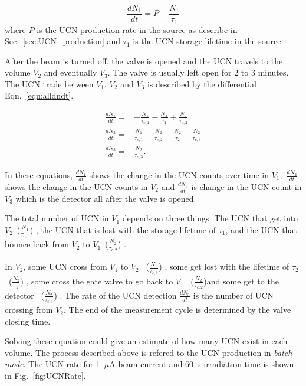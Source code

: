 \begin{equation}
  \label{eqn:dndt}
\frac{dN_1}{dt} = P - \frac{N_1}{\tau_1}  
\end{equation}
where $P$ is the UCN production rate in the source as describe in
Sec.~\ref{sec:UCN_production} and $\tau_1$ is the UCN storage lifetime
in the source.

After the beam is turned off, the valve is opened and the UCN travels
to the volume $V_2$ and eventually $V_3$. The valve is usually left
open for 2 to 3 minutes. The UCN trade between $V_1$, $V_2$ and $V_3$
is described by the differential Eqn.~\ref{eqn:alldndt}.

\begin{equation}
  \label{eqn:alldndt}
  \begin{aligned}
    \frac{dN_1}{dt} =&- \frac{N_1}{\tau_{c,1}} - \frac{N_1}{\tau_1} + \frac{N_2}{\tau_{c,2}}  \\
    \frac{dN_2}{dt} =& \frac{N_1}{\tau_{c,1}} - \frac{N_2}{\tau_{c,2}} - \frac{N_2}{\tau_2} - \frac{N_2}{\tau_{c,3}} \\
    \frac{dN_3}{dt} =& \frac{N_2}{\tau_{c,3}}.
  \end{aligned}
\end{equation}


In these equations, \large $\frac{dN_1}{dt}$ \normalsize shows the
change in the UCN counts over time in $V_1$,~\large $\frac{dN_2}{dt}$
\normalsize shows the change in the UCN counts in $V_2$ and \large
$\frac{dN_3}{dt}$ \normalsize is change in the UCN count in $V_3$
which is the detector all after the valve is opened.

The total number of UCN in $V_1$ depends on three things. The UCN that
get into $V_2$~\large($\frac{N_1}{\tau_{c,1}}$) \normalsize, the UCN that is lost
with the storage lifetime of $\tau_1$, and the UCN that bounce back from
$V_2$ to $V_1$~\large ($\frac{N_2}{\tau_{c,2}}$) \normalsize.

In $V_2$, some UCN cross from $V_1$ to $V_2$~ \large
($\frac{N_1}{\tau_{c,1}}$) \normalsize, some get lost with the
lifetime of $\tau_2$~\large ($\frac{N_2}{\tau_2}$) \normalsize, some
cross the gate valve to go back to $V_1$~ \large
($\frac{N_2}{\tau_{c,2}}$)\normalsize and some get to the detector
~\large ($\frac{N_2}{\tau_{c,3}}$) \normalsize. The rate of the UCN
detection $\frac{dN_3}{dt}$ is the number of UCN crossing from $V_2$.
The end of the measurement cycle is determined by the valve closing
time.

Solving these equation could give an estimate of how many UCN exist in
each volume. The process described above is refered to the UCN
production in {\it {batch mode}}. The UCN rate for 1~$\mu$A beam current
and 60~s irradiation time is shown in Fig.~\ref{fig:UCNRate}.


